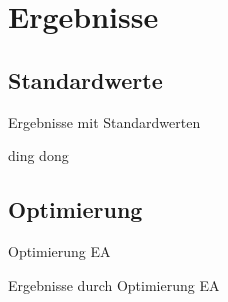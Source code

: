 \section{Ergebnisse}

\subsection{Standardwerte}
\begin{frame}{Ergebnisse mit Standardwerten}
	\begin{center}
		ding dong
	\end{center}   
\end{frame}

\subsection{Optimierung}
\begin{frame}{Optimierung}
	EA 
\end{frame}

\begin{frame}{Ergebnisse durch Optimierung}
	EA 
\end{frame}
